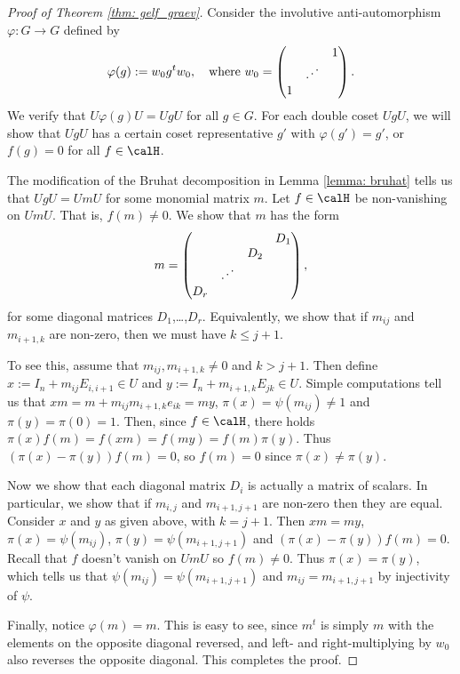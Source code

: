 \begin{proof}[Proof of Theorem \ref{thm: gelf_graev}]
	Consider the involutive anti-automorphism $\varphi\colon G \to G$ defined by
	\[
		\varphi(g) := w_0 g^t w_0,\quad\text{where}\ w_0 =
		\begin{pmatrix}
			  &                       & 1 \\
			  & \reflectbox{$\ddots$} &   \\
			1 &                       &
		\end{pmatrix}.
	\]
	We verify that $U\varphi(g)U=UgU$ for all $g\in G$.
	For each double coset $UgU$, we will show that $UgU$ has a certain coset representative $g'$ with $\varphi(g')=g'$, or $f(g)=0$ for all $f\in\calH$.

	The modification of the Bruhat decomposition in Lemma \ref{lemma: bruhat} tells us that $UgU=UmU$ for some monomial matrix $m$.
	Let $f\in\calH$ be non-vanishing on $UmU$.
	That is, $f(m)\neq 0$.
	We show that $m$ has the form
	\[
		m = \begin{pmatrix}
			    &                       &     & D_1 \\
			    &                       & D_2 &     \\
			    & \reflectbox{$\ddots$} &     &     \\
			D_r &                       &     &
		\end{pmatrix},
	\]
	for some diagonal matrices $D_1$,\ldots,$D_r$.
	Equivalently, we show that if $m_{ij}$ and $m_{i+1,k}$ are non-zero, then we must have $k\leq j+1$.

	To see this, assume that $m_{ij},m_{i+1,k}\neq 0$ and $k>j+1$.
	Then define $x :=I_n + m_{ij}E_{i,i+1}\in U$ and $y:= I_n +m_{i+1,k}E_{jk}\in U$.
	Simple computations tell us that $xm = m+m_{ij}m_{i+1,k}e_{ik} = my$, $\pi(x)=\psi(m_{ij})\neq 1$ and $\pi(y)=\pi(0)=1$.
	Then, since $f\in\calH$, there holds $\pi(x)f(m)=f(xm)=f(my)=f(m)\pi(y)$.
	Thus $(\pi(x)-\pi(y))f(m)=0$, so $f(m)=0$ since $\pi(x)\neq \pi(y)$.

	Now we show that each diagonal matrix $D_i$ is actually a matrix of scalars.
	In particular, we show that if $m_{i,j}$ and $m_{i+1,j+1}$ are non-zero then they are equal.
	Consider $x$ and $y$ as given above, with $k=j+1$.
	Then $xm=my$, $\pi(x)=\psi(m_{ij})$, $\pi(y)=\psi(m_{i+1,j+1})$ and $(\pi(x)-\pi(y))f(m)=0$.
	Recall that $f$ doesn't vanish on $UmU$ so $f(m)\neq 0$.
	Thus $\pi(x)=\pi(y)$, which tells us that $\psi(m_{ij})=\psi(m_{i+1,j+1})$ and $m_{ij}=m_{i+1,j+1}$ by injectivity of $\psi$.

	Finally, notice $\varphi(m)=m$.
	This is easy to see, since $m^t$ is simply $m$ with the elements on the opposite diagonal reversed, and left- and right-multiplying by $w_0$ also reverses the opposite diagonal.
	This completes the proof.
\end{proof}

